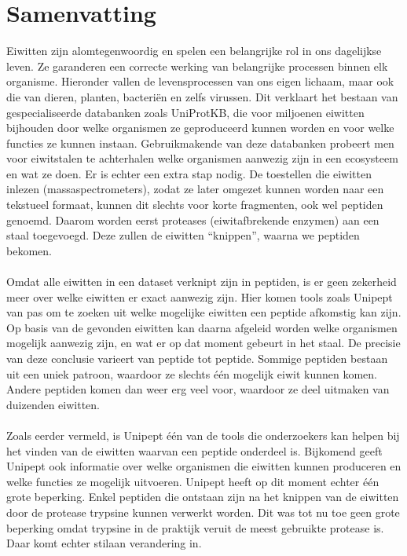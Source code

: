 \chapter*{Samenvatting}
Eiwitten zijn alomtegenwoordig en spelen een belangrijke rol in ons dagelijkse leven.
Ze garanderen een correcte werking van belangrijke processen binnen elk organisme.
Hieronder vallen de levensprocessen van ons eigen lichaam, maar ook die van dieren, planten, bacteriën en zelfs virussen.
Dit verklaart het bestaan van gespecialiseerde databanken zoals UniProtKB, die voor miljoenen eiwitten bijhouden door welke organismen ze geproduceerd kunnen worden en voor welke functies ze kunnen instaan.
Gebruikmakende van deze databanken probeert men voor eiwitstalen te achterhalen welke organismen aanwezig zijn in een ecosysteem en wat ze doen.
Er is echter een extra stap nodig.
De toestellen die eiwitten inlezen (massaspectrometers), zodat ze later omgezet kunnen worden naar een tekstueel formaat, kunnen dit slechts voor korte fragmenten, ook wel peptiden genoemd.
Daarom worden eerst proteases (eiwitafbrekende enzymen) aan een staal toegevoegd.
Deze zullen de eiwitten ``knippen'', waarna we peptiden bekomen.
\\ \\
Omdat alle eiwitten in een dataset verknipt zijn in peptiden, is er geen zekerheid meer over welke eiwitten er exact aanwezig zijn.
Hier komen tools zoals Unipept van pas om te zoeken uit welke mogelijke eiwitten een peptide afkomstig kan zijn.
Op basis van de gevonden eiwitten kan daarna afgeleid worden welke organismen mogelijk aanwezig zijn, en wat er op dat moment gebeurt in het staal.
De precisie van deze conclusie varieert van peptide tot peptide.
Sommige peptiden bestaan uit een uniek patroon, waardoor ze slechts één mogelijk eiwit kunnen komen.
Andere peptiden komen dan weer erg veel voor, waardoor ze deel uitmaken van duizenden eiwitten.
\\ \\
Zoals eerder vermeld, is Unipept één van de tools die onderzoekers kan helpen bij het vinden van de eiwitten waarvan een peptide onderdeel is.
Bijkomend geeft Unipept ook informatie over welke organismen die eiwitten kunnen produceren en welke functies ze mogelijk uitvoeren.
Unipept heeft op dit moment echter één grote beperking.
Enkel peptiden die ontstaan zijn na het knippen van de eiwitten door de protease trypsine kunnen verwerkt worden.
Dit was tot nu toe geen grote beperking omdat trypsine in de praktijk veruit de meest gebruikte protease is.
Daar komt echter stilaan verandering in.

